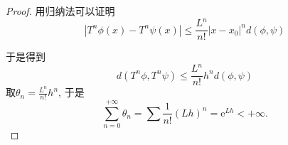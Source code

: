 \begin{proof}
  用归纳法可以证明
  \begin{equation}
    \left| T^{n} \phi (x) - T^{n}\psi (x) \right| \le  \frac{L^{n}}{n!} \left| x-x_0 \right|^{n} d(\phi ,\psi )
  \end{equation}

  于是得到
  \begin{equation}
    d\left( T^{n}\phi , T^{n}\psi  \right) \le \frac{L^{n}}{n!} h^{n} d(\phi ,\psi )
  \end{equation}
  取$\theta_{n} = \frac{L^{n}}{n!} h^{n}$, 于是
  \begin{equation}
    \sum_{n=0}^{+\infty } \theta_{n} = \sum \frac{1}{n!} \left( Lh \right)^{n} = \mathrm{e}^{Lh} < +\infty .
  \end{equation}
\end{proof}

